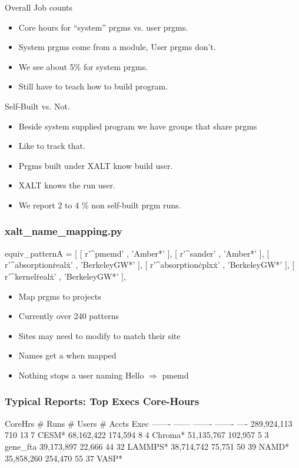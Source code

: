 \documentclass{beamer}
\begin{document}
\begin{frame}{Overall Job counts}
  \begin{itemize}
    \item Core hours for ``system'' prgms vs. user prgms.
    \item System prgms come from a module, User prgms don't.
    \item We see about 5\% for system prgms.
    \item Still have to teach how to build program.
  \end{itemize}
\end{frame}

\begin{frame}{Self-Built vs. Not.}
  \begin{itemize}
    \item Beside system supplied program we have groups that share prgms
    \item Like to track that.
    \item Prgms built under XALT know build user.
    \item XALT knows the run user.
    \item We report 2 to 4 \% non self-built prgm runs.
  \end{itemize}
\end{frame}

\begin{frame}[fragile]
    \frametitle{xalt\_name\_mapping.py}
 {\small
    \begin{semiverbatim}
equiv_patternA = [
    [ r'^pmemd'               , 'Amber*'      ],
    [ r'^sander'              , 'Amber*'      ],
    [ r'^absorption\.real\.x' , 'BerkeleyGW*' ],
    [ r'^absorption\.cplx\.x' , 'BerkeleyGW*' ],
    [ r'^kernel\.real\.x'     , 'BerkeleyGW*' ],
    \end{semiverbatim}
}
  \begin{itemize}
    \item Map prgms to projects 
    \item Currently over 240 patterns
    \item Sites may need to modify to match their site
    \item Names get a \* when mapped
    \item Nothing stops a user naming Hello $\Rightarrow$ pmemd
  \end{itemize}

\end{frame}

\begin{frame}[fragile]
    \frametitle{Typical Reports: Top Execs Core-Hours}
 {\small
    \begin{semiverbatim}
    CoreHrs   # Runs  # Users  # Accts  Exec
    -------   ------  -------  -------  ----
289,924,113      710       13        7  CESM*
 68,162,422  174,594        8        4  Chroma*
 51,135,767  102,957        5        3  gene_fta
 39,173,897   22,666       44       32  LAMMPS*
 38,714,742   75,751       50       39  NAMD*
 35,858,260  254,470       55       37  VASP*
    \end{semiverbatim}
}
\end{frame}
\end{document}
